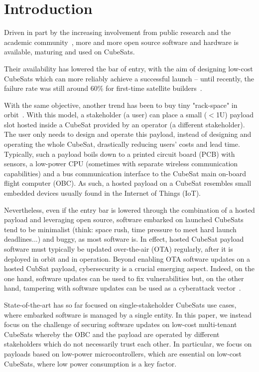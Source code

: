 \section{Introduction}
\label{sec:introduction}

Driven in part by the increasing involvement from public research and the academic
community~\cite{cubesat101}, more and more open source software and hardware is available,
maturing and used on CubeSats.

Their availability has lowered the bar of entry, with the aim of designing low-cost
CubeSats which can more reliably achieve a successful launch -- until recently, the
failure rate was still around 60\% for first-time satellite builders~\cite{Holliday2019PyCubed}.

With the same objective, another trend has been to buy tiny "rack-space" in
orbit~\cite{satrevolution2020}. With this model, a stakeholder (a user) can place
a small ($<$1U) payload slot hosted inside a CubeSat provided by an operator
(a different stakeholder). The user only needs to design and operate this payload,
instead of designing and operating the whole CubeSat, drastically reducing users'
costs and lead time. Typically, such a payload boils down to a printed circuit board
(PCB) with sensors, a low-power CPU (sometimes with separate wireless communication
capabilities) and a bus communication interface to the CubeSat main on-board flight
computer (OBC). As such, a hosted payload on a CubeSat resembles small embedded
devices usually found in the Internet of Things (IoT).

Nevertheless, even if the entry bar is lowered through the combination of a hosted payload
and leveraging open source, software embarked on launched CubeSats tend to be
minimalist (think: space rush, time pressure to meet hard launch deadlines...)
and buggy, as most software is. In effect, hosted CubeSat payload software must
typically be updated over-the-air (OTA) regularly, after it is deployed in orbit
and in operation. Beyond enabling OTA software updates on a hosted CubSat payload,
cybersecurity is a crucial emerging aspect. Indeed, on the one hand, software
updates can be used to fix vulnerabilities but, on the other hand, tampering with
software updates can be used as a cyberattack vector~\cite{ccleaner}.

State-of-the-art has so far focused on single-stakeholder CubeSats use cases,
where embarked software is managed by a single entity. In this paper, we instead
focus on the challenge of securing software updates on low-cost multi-tenant CubeSats
whereby the OBC and the payload are operated by different stakeholders which do not
necessarily trust each other. In particular, we focus on payloads based on low-power
microcontrollers, which are essential on low-cost CubeSats, where
low power consumption is a key factor.
